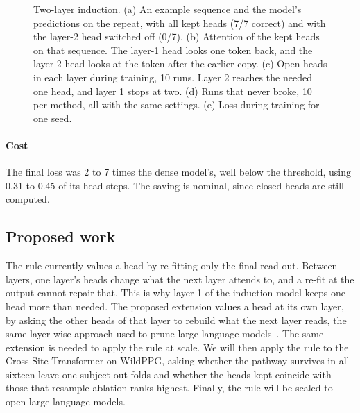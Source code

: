 \begin{figure}[hbtp]
\centering
{}
\caption[Two-layer induction]{Two-layer induction.
(a) An example sequence and the model's predictions on the repeat, with all kept heads (7/7 correct) and with the layer-2 head switched off (0/7).
(b) Attention of the kept heads on that sequence. The layer-1 head looks one token back, and the layer-2 head looks at the token after the earlier copy.
(c) Open heads in each layer during training, 10 runs. Layer 2 reaches the needed one head, and layer 1 stops at two.
(d) Runs that never broke, 10 per method, all with the same settings.
(e) Loss during training for one seed.}
\label{fig:induction}
\end{figure}

\paragraph{Cost}
The final loss was 2 to 7 times the dense model's, well below the threshold, using 0.31 to 0.45 of its head-steps. The saving is nominal, since closed heads are still computed.

\subsection{Proposed work}

The rule currently values a head by re-fitting only the final read-out. Between layers, one layer's heads change what the next layer attends to, and a re-fit at the output cannot repair that. This is why layer 1 of the induction model keeps one head more than needed. The proposed extension values a head at its own layer, by asking the other heads of that layer to rebuild what the next layer reads, the same layer-wise approach used to prune large language models~\citep{ziplm}. The same extension is needed to apply the rule at scale. We will then apply the rule to the Cross-Site Transformer on WildPPG, asking whether the \wl{} pathway survives in all sixteen leave-one-subject-out folds and whether the heads kept coincide with those that resample ablation ranks highest. Finally, the rule will be scaled to open large language models.